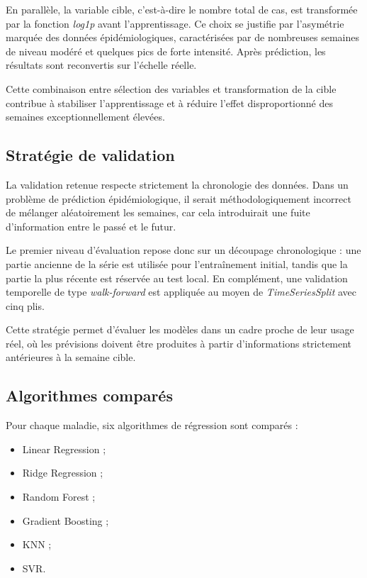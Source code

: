 En parallèle, la variable cible, c'est-à-dire le nombre total de cas, est transformée par la fonction \textit{log1p} avant l'apprentissage. Ce choix se justifie par l'asymétrie marquée des données épidémiologiques, caractérisées par de nombreuses semaines de niveau modéré et quelques pics de forte intensité. Après prédiction, les résultats sont reconvertis sur l'échelle réelle.

Cette combinaison entre sélection des variables et transformation de la cible contribue à stabiliser l'apprentissage et à réduire l'effet disproportionné des semaines exceptionnellement élevées.

\subsection{Stratégie de validation}

La validation retenue respecte strictement la chronologie des données. Dans un problème de prédiction épidémiologique, il serait méthodologiquement incorrect de mélanger aléatoirement les semaines, car cela introduirait une fuite d'information entre le passé et le futur.

Le premier niveau d'évaluation repose donc sur un découpage chronologique : une partie ancienne de la série est utilisée pour l'entraînement initial, tandis que la partie la plus récente est réservée au test local. En complément, une validation temporelle de type \textit{walk-forward} est appliquée au moyen de \textit{TimeSeriesSplit} avec cinq plis.

Cette stratégie permet d'évaluer les modèles dans un cadre proche de leur usage réel, où les prévisions doivent être produites à partir d'informations strictement antérieures à la semaine cible.

\subsection{Algorithmes comparés}

Pour chaque maladie, six algorithmes de régression sont comparés :

\begin{itemize}
  \item Linear Regression ;
  \item Ridge Regression ;
  \item Random Forest ;
  \item Gradient Boosting ;
  \item KNN ;
  \item SVR.
\end{itemize}

